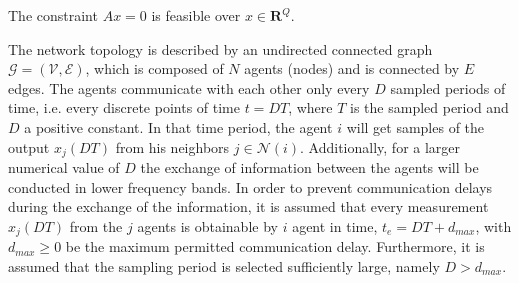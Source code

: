    \begin{assumption}\label{asm:3}
        The constraint $Ax = 0$ is feasible over $x \in \mathbf{R}^Q$.
    \end{assumption}
    
    \begin{assumption}\label{asm:4}
        The network topology is described by an undirected connected graph $\mathcal{G} = (\mathcal{V}, \mathcal{E})$, which is composed of $N$ agents (nodes) and is connected by $E$ edges. The agents communicate with each other only every $D$ sampled periods of time, i.e. every discrete points of time $t = DT$, where $T$ is the sampled period and $D$ a positive constant. In that time period, the agent $i$ will get samples of the output $x_j(DT)$ from his neighbors $j \in \mathcal{N}(i)$. Additionally, for a larger numerical value of $D$ the exchange of information between the agents will be conducted in lower frequency bands. In order to prevent communication delays during the exchange of the information, it is assumed that every measurement $x_j(DT)$ from the $j$ agents is obtainable by $i$ agent in time, $t_e = DT + d_{max}$, with $d_{max} \geq 0$ be the maximum permitted communication delay. Furthermore, it is assumed that the sampling period is selected sufficiently large, namely $D > d_{max}$.
    \end{assumption}

